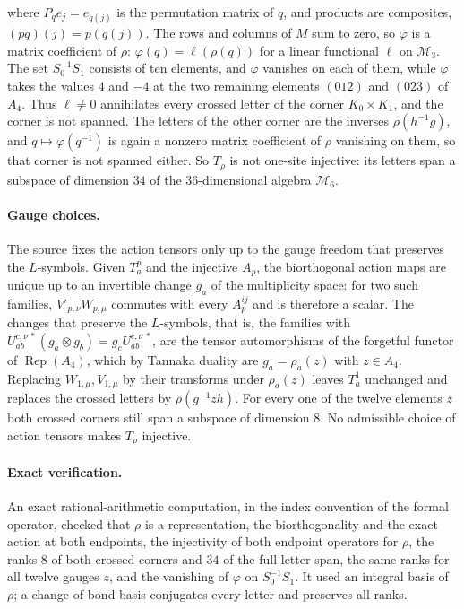 \documentclass{article}
\begin{document}
where $P_qe_j=e_{q(j)}$ is the permutation matrix of $q$, and products
are composites, $(pq)(j)=p(q(j))$. The rows and columns of $M$
sum to zero, so $\varphi$ is a matrix coefficient of $\rho$:
$\varphi(q)=\ell(\rho(q))$ for a linear functional $\ell$ on $\mathcal M_3$.
The set $S_0^{-1}S_1$ consists of ten elements, and $\varphi$ vanishes on
each of them, while $\varphi$ takes the values $4$ and $-4$ at the two
remaining elements $(012)$ and $(023)$ of $A_4$. Thus $\ell\ne0$
annihilates every crossed letter of the corner $K_0\times K_1$, and the
corner is not spanned. The letters of the other corner are the inverses
$\rho(h^{-1}g)$, and $q\mapsto\varphi(q^{-1})$ is again a nonzero matrix
coefficient of $\rho$ vanishing on them, so that corner is not spanned
either. So $T_\rho$
is not one-site injective: its letters span a subspace of dimension $34$ of
the $36$-dimensional algebra $\mathcal M_6$.

\paragraph{Gauge choices.} The source fixes the action tensors only up to
the gauge freedom that preserves the $L$-symbols. Given $T^p_a$ and the
injective $A_p$, the biorthogonal action maps are unique up to an
invertible change $g_a$ of the multiplicity space: for two such families,
$V'_{p,\nu}W_{p,\mu}$ commutes with every $A_p^{ij}$ and is therefore a
scalar. The changes that preserve the $L$-symbols, that is, the families
with $U^{c,\nu\,*}_{ab}(g_a\otimes g_b)=g_cU^{c,\nu\,*}_{ab}$, are the tensor
automorphisms of the forgetful functor of $\operatorname{Rep}(A_4)$, which
by Tannaka duality are $g_a=\rho_a(z)$ with $z\in A_4$. Replacing
$W_{1,\mu},V_{1,\mu}$ by their transforms under $\rho_a(z)$ leaves
$T^1_a$ unchanged and replaces the crossed letters by $\rho(g^{-1}zh)$. For
every one of the twelve elements $z$ both crossed corners still span a
subspace of dimension $8$. No admissible choice of action tensors makes
$T_\rho$ injective.

\paragraph{Exact verification.} An exact rational-arithmetic computation,
in the index convention of the formal operator, checked that $\rho$ is a
representation, the biorthogonality and the exact action at both endpoints, the injectivity of both endpoint operators
for $\rho$, the ranks $8$ of both crossed corners and $34$ of the full letter
span, the same ranks for all twelve gauges $z$, and the vanishing of
$\varphi$ on $S_0^{-1}S_1$. It used an integral basis of $\rho$; a change
of bond basis conjugates every letter and preserves all ranks.
\end{document}
